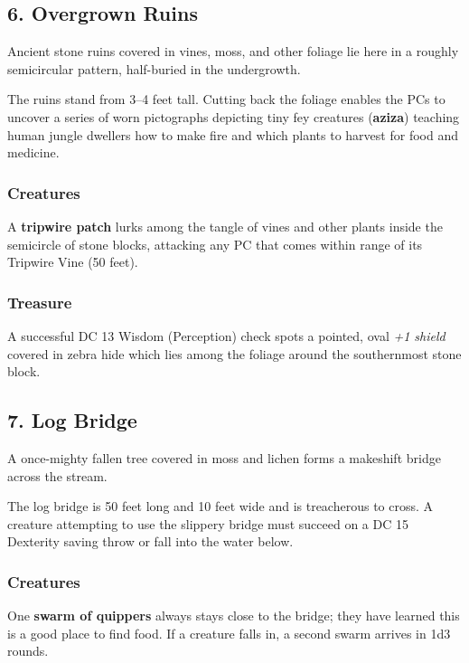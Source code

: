 \documentclass[10pt,a4paper,twoside,bg=print,twocolumn,openany,nodeprecatedcode]{dndbook}
\begin{document}
\subsection{6. Overgrown Ruins}
\begin{DndReadAloud}{}
Ancient stone ruins covered in vines, moss, and other foliage lie here in a roughly semicircular pattern, half-buried in the undergrowth.

\end{DndReadAloud}

The ruins stand from 3–4 feet tall. Cutting back the foliage enables the PCs to uncover a series of worn pictographs depicting tiny fey creatures (\textbf{aziza}) teaching human jungle dwellers how to make fire and which plants to harvest for food and medicine.

\subsubsection{Creatures}
A \textbf{tripwire patch} lurks among the tangle of vines and other plants inside the semicircle of stone blocks, attacking any PC that comes within range of its Tripwire Vine (50 feet).

\subsubsection{Treasure}
A successful DC 13 Wisdom (Perception) check spots a pointed, oval \textit{+1 shield} covered in zebra hide which lies among the foliage around the southernmost stone block.

\subsection{7. Log Bridge}
\begin{DndReadAloud}{}
A once-mighty fallen tree covered in moss and lichen forms a makeshift bridge across the stream.

\end{DndReadAloud}

The log bridge is 50 feet long and 10 feet wide and is treacherous to cross. A creature attempting to use the slippery bridge must succeed on a DC 15 Dexterity saving throw or fall into the water below.

\subsubsection{Creatures}
One \textbf{swarm of quippers} always stays close to the bridge; they have learned this is a good place to find food. If a creature falls in, a second swarm arrives in 1d3 rounds.
\end{document}
